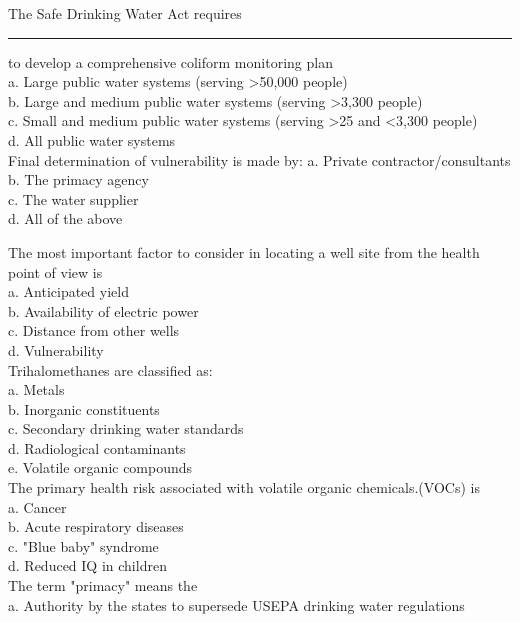 The Safe Drinking Water Act requires \rule{1.5cm}{0.1mm} to develop a comprehensive coliform monitoring plan\\
a. Large public water systems (serving >50,000 people)\\
b. Large and medium public water systems (serving >3,300 people)\\
c. Small and medium public water systems (serving >25 and <3,300 people)\\
d. All public water systems\\

Final determination of vulnerability is made by:
a. Private contractor/consultants\\
b. The primacy agency\\
c. The water supplier\\
d. All of the above

The most important factor to consider in locating a well site from the health point of view is\\
a. Anticipated yield\\
b. Availability of electric power\\
c. Distance from other wells\\
d. Vulnerability\\

Trihalomethanes are classified as:\\
a. Metals\\
b. Inorganic constituents\\
c. Secondary drinking water standards\\
d. Radiological contaminants\\
e. Volatile organic compounds\\


  The primary health risk associated with volatile organic chemicals.(VOCs) is\\

a. Cancer\\

b. Acute respiratory diseases\\

c. "Blue baby" syndrome\\

d. Reduced IQ in children\\

The term "primacy" means the\\

a. Authority by the states to supersede USEPA drinking water regulations\\


